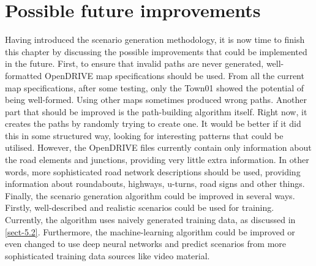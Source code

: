 \section{Possible future improvements} \label{sect-5.4}

Having introduced the scenario generation methodology, it is now time to finish this chapter by discussing the possible improvements that could be implemented in the future.
First, to ensure that invalid paths are never generated, well-formatted OpenDRIVE map specifications should be used. From all the current map specifications, after some testing, only the Town01 showed the potential of being well-formed. Using other maps sometimes produced wrong paths.
Another part that should be improved is the path-building algorithm itself. Right now, it creates the paths by randomly trying to create one. It would be better if it did this in some structured way, looking for interesting patterns that could be utilised. However, the OpenDRIVE files currently contain only information about the road elements and junctions, providing very little extra information. In other words, more sophisticated road network descriptions should be used, providing information about roundabouts, highways, u-turns, road signs and other things.
Finally, the scenario generation algorithm could be improved in several ways. Firstly, well-described and realistic scenarios could be used for training. Currently, the algorithm uses naively generated training data, as discussed in \autoref{sect-5.2}. Furthermore, the machine-learning algorithm could be improved or even changed to use deep neural networks and predict scenarios from more sophisticated training data sources like video material.
